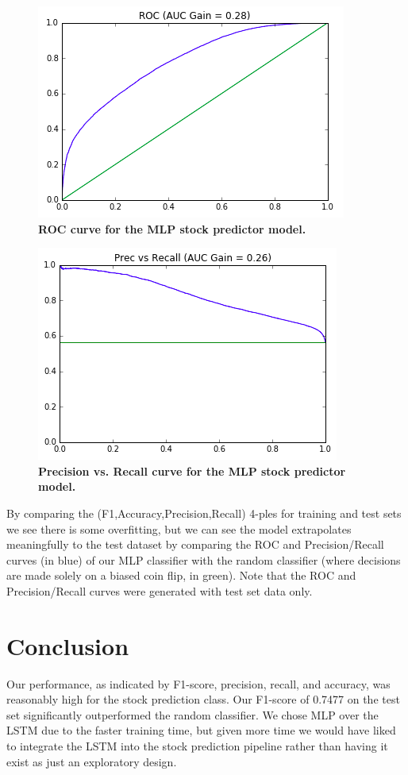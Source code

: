 \documentclass{sig-alternate-05-2015}
\begin{document}
\begin{figure}[H]
	\centering\includegraphics[scale=0.6]{mlp1} 
	\caption{\textbf{ROC curve for the MLP stock predictor model.}}
\end{figure}

\begin{figure}[H]
	\centering\includegraphics[scale=0.6]{mlp2} 
	\caption{\textbf{Precision vs. Recall curve for the MLP stock predictor model.}}
\end{figure}

	
By comparing the (F1,Accuracy,Precision,Recall) 4-ples for training and test sets we see there is some overfitting, but we can see the model extrapolates meaningfully to the test dataset by comparing the ROC and Precision/Recall curves (in blue) of our MLP classifier with the random classifier (where decisions are made solely on a biased coin flip, in green).  Note that the ROC and Precision/Recall curves were generated with test set data only.


\section{Conclusion}
Our performance, as indicated by F1-score, precision, recall, and accuracy, was reasonably high for the stock prediction class. Our F1-score of 0.7477 on the test set significantly outperformed the random classifier. We chose MLP over the LSTM due to the faster training time, but given more time we would have liked to integrate the LSTM into the stock prediction pipeline rather than having it exist as just an exploratory design.
\end{document}
